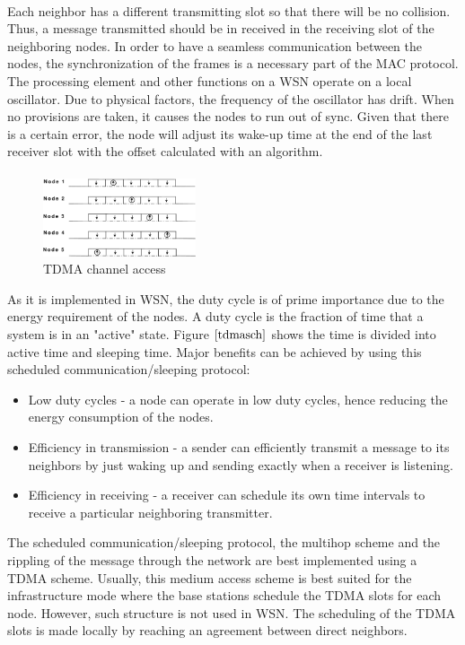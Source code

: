\documentclass[a4paper,10pt]{report}
\begin{document}
\paragraph*{}
Each neighbor has a different transmitting slot so that there will be no collision. Thus, a message transmitted should be in received in the receiving slot of the neighboring nodes. In order to have a seamless communication between the nodes, the synchronization of the frames is a necessary part of the MAC protocol. The processing element and other functions on a WSN operate on a local oscillator. Due to physical factors, the frequency of the oscillator has drift. When no provisions are taken, it causes the nodes to run out of sync. Given that there is a certain error, the node will adjust its wake-up time at the end of the last receiver slot with the offset calculated with an algorithm. \paragraph*{}
\begin{figure}
\centering
\includegraphics[width=0.4\textwidth]{tdmaschedule}
\caption{TDMA channel access} \label{tdmasch}
\end{figure}
As it is implemented in WSN, the duty cycle is of prime importance due to the energy requirement of the nodes. A duty cycle is the fraction of time that a system is in an "active" state. Figure $\ref{tdmasch}$ shows the time is divided into active time and sleeping time. Major benefits can be achieved by using this scheduled communication/sleeping protocol:
\begin{itemize}
\item Low duty cycles - a node can operate in low duty cycles, hence reducing the energy consumption of the nodes.
\item Efficiency in transmission - a sender can efficiently transmit a message to its neighbors by just waking up and sending exactly when a receiver is listening.
\item Efficiency in receiving - a receiver can schedule its own time intervals to receive a particular neighboring transmitter.
\end{itemize}
The scheduled communication/sleeping protocol, the multihop scheme and the rippling of the message through the network are best implemented using a TDMA scheme. Usually, this medium access scheme is best suited for the infrastructure mode where the base stations schedule the TDMA slots for each node. However, such structure is not used in WSN. The scheduling of the TDMA slots is made locally by reaching an agreement between direct neighbors.
\end{document}
